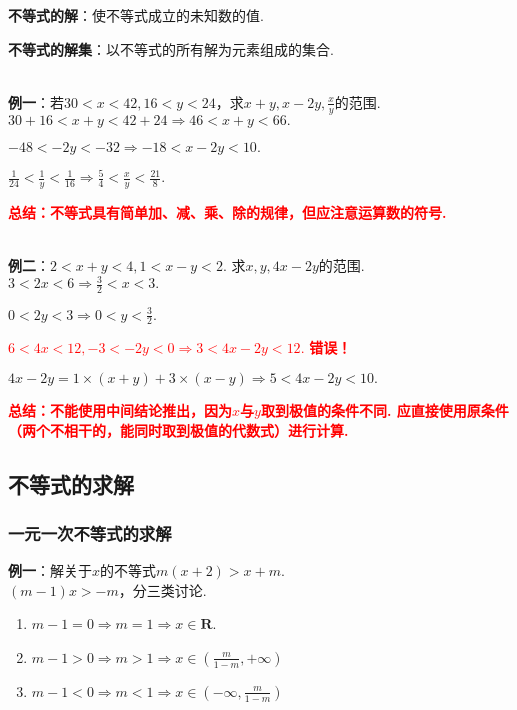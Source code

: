 \documentclass[8pt]{article}
\begin{document}
			\textbf{不等式的解}：使不等式成立的未知数的值.

			\textbf{不等式的解集}：以不等式的所有解为元素组成的集合.

			~\\

			\textbf{例一}：若$30<x<42, 16<y<24$，求$x+y, x-2y, \frac{x}{y}$的范围.
				~\\

				$30+16<x+y<42+24 \Rightarrow 46<x+y<66.$

				$-48<-2y<-32 \Rightarrow -18<x-2y<10.$

				$\displaystyle \frac{1}{24}<\frac{1}{y}<\frac{1}{16} \Rightarrow \frac{5}{4}<\frac{x}{y}<\frac{21}{8}.$

				\textcolor{red}{\textbf{总结：不等式具有简单加、减、乘、除的规律，但应注意运算数的符号.}}

			~\\

			\textbf{例二}：$2<x+y<4, 1<x-y<2$. 求$x, y, 4x-2y$的范围.
				~\\

				$\displaystyle 3<2x<6 \Rightarrow \frac{3}{2}<x<3.$

				$\displaystyle 0<2y<3 \Rightarrow 0<y<\frac{3}{2}.$

				\textcolor{red}{$6<4x<12, -3<-2y<0 \Rightarrow 3<4x-2y<12.$ \textbf{错误！}}

				$4x-2y=1\times(x+y)+3\times(x-y) \Rightarrow 5<4x-2y<10.$

				\textcolor{red}{\textbf{总结：不能使用中间结论推出，因为$x$与$y$取到极值的条件不同. 应直接使用原条件（两个不相干的，能同时取到极值的代数式）进行计算.}}

		\newpage
		\subsection{不等式的求解}
			\subsubsection{一元一次不等式的求解}
				\textbf{例一}：解关于$x$的不等式$m(x+2)>x+m$.
					~\\

					$(m-1)x>-m$，分三类讨论.

					\begin{enumerate}[label=$\arabic*^{\circ}$]
						\item $\displaystyle m-1=0\Rightarrow m=1 \Rightarrow x\in\mathbf{R}$.
						\item $\displaystyle m-1>0\Rightarrow m>1 \Rightarrow x\in\left(\frac{m}{1-m}, +\infty\right)$
						\item $\displaystyle m-1<0\Rightarrow m<1 \Rightarrow x\in\left(-\infty, \frac{m}{1-m}\right)$
					\end{enumerate}
\end{document}
